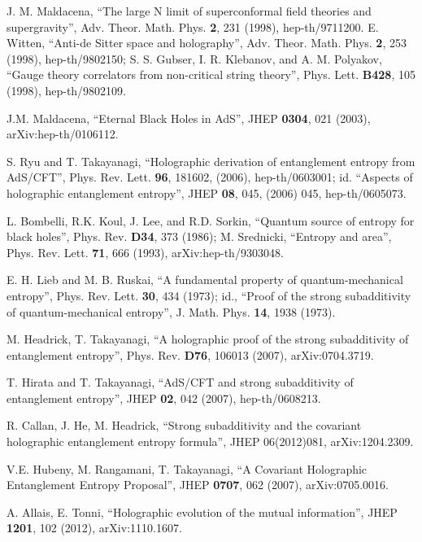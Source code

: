 \documentclass[12pt]{article}
\begin{document}
\begin{thebibliography}{99}
J. M. Maldacena, ``The large N limit of superconformal field theories and supergravity'', 
Adv. Theor. Math. Phys. \textbf{2}, 231 (1998), hep-th/9711200. 
E. Witten, ``Anti-de Sitter space and holography'', Adv. Theor. Math. Phys. \textbf{2}, 253 (1998), hep-th/9802150;
S. S. Gubser, I. R. Klebanov, and A. M. Polyakov, ``Gauge theory correlators from non-critical 
string theory'', Phys. Lett. \textbf{B428}, 105 (1998), hep-th/9802109.

J.M. Maldacena, ``Eternal Black Holes in AdS'',  JHEP \textbf{0304}, 021 (2003),  arXiv:hep-th/0106112.

S. Ryu and T. Takayanagi, ``Holographic derivation of entanglement entropy from AdS/CFT'', 
Phys. Rev. Lett. \textbf{96}, 181602, (2006), hep-th/0603001; 
id. ``Aspects of holographic entanglement entropy'', JHEP \textbf{08}, 045, (2006) 045, hep-th/0605073.

L. Bombelli, R.K. Koul, J. Lee, and R.D. Sorkin, ``Quantum source of 
entropy for black holes'', Phys. Rev. \textbf{D34}, 373 (1986); M. Srednicki, 
``Entropy and area'', Phys. Rev. Lett. \textbf{71}, 666 (1993), arXiv:hep-th/9303048.

E. H. Lieb and M. B. Ruskai, ``A fundamental property of quantum-mechanical entropy'',
 Phys. Rev. Lett. \textbf{30}, 434 (1973); id., 
``Proof of the strong subadditivity of quantum-mechanical entropy'', 
J. Math. Phys. \textbf{14}, 1938 (1973).

 M. Headrick, T. Takayanagi, ``A holographic proof of the strong subadditivity of entanglement entropy'', Phys. Rev. \textbf{D76}, 106013 (2007), arXiv:0704.3719.

T. Hirata and T. Takayanagi, ``AdS/CFT and strong subadditivity of entanglement entropy'', 
JHEP \textbf{02}, 042 (2007), hep-th/0608213.

R. Callan, J. He, M. Headrick,
``Strong subadditivity and the covariant holographic entanglement entropy formula'', JHEP 06(2012)081, 
arXiv:1204.2309.

V.E. Hubeny, M. Rangamani, T. Takayanagi, ``A Covariant Holographic Entanglement Entropy Proposal'',  
JHEP \textbf{0707}, 062 (2007), arXiv:0705.0016.

A. Allais, E. Tonni, ``Holographic evolution of the mutual information'',  JHEP \textbf{1201}, 102 (2012),  arXiv:1110.1607.


\end{thebibliography}
\end{document}
